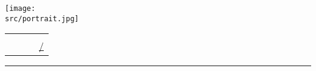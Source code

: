 \newcommand{\portraitbox}{
	\begin{minipage}[c]{0.14\linewidth}
	\texttt{[image: \\src/portrait.jpg]}
	\end{minipage}
	\hspace*{6pt}	%
}
\newcommand{\namebox}{
	\begin{minipage}[c]{0.5\linewidth}
	\fontsize{28}{0}\selectfont \name
	\end{minipage}
	\hfill
}
\newcommand{\contactbox}{
	\begin{minipage}[b]{0.48\linewidth}
	\begin{flushright}
	\setlength{\tabcolsep}{2pt}
	\begin{tabular}{c l @{\hspace*{10pt}} c l}
	\icon{id-card.png} 		& \birthday & 
	\icon{envelope.png} 	& \href{mailto:\email}{\email} \\
	\icon{telephone.png}	& \phone &
	\icon{linkedin.png} 	& \href{https://linkedin.com/in/\linkedin}{/\linkedin} 
	\end{tabular}
	\end{flushright}
	\end{minipage}
}

\ifuseportrait
	\portraitbox
	\begin{minipage}[c]{0.83\linewidth}
\fi

\namebox
\contactbox
\vspace{5pt}
\hrule
\vspace{7pt}


\ifuseportrait	
	\end{minipage}
\fi

\vspace*{2pt}

